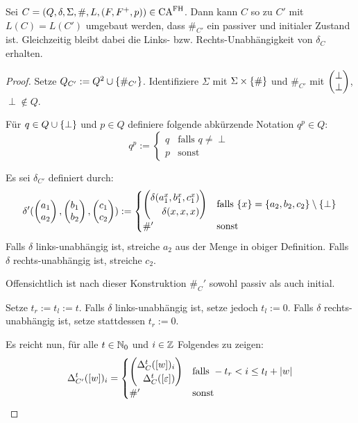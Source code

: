 \begin{satz}
    Sei $C = (Q, \delta, \Sigma, \#, L, (F, F^+, p)) \in \textrm{CA}^{\textrm{FH}}$. Dann kann $C$ so zu $C'$ mit $L(C) = L(C')$ umgebaut werden, dass $\#_{C'}$ ein passiver und initialer Zustand ist.
    Gleichzeitig bleibt dabei die Links- \acs{bzw.} Rechts-Unabhängigkeit von $\delta_C$ erhalten.
\end{satz}
\begin{proof}
    Setze $Q_{C'} := Q^2 \cup \{ { \#_{C'} } \}$. Identifiziere $\Sigma$ mit $ \Sigma \times \{ {\#} \}$ und $\#_{C'}$ mit $\Spvek{\perp; \perp}$, $\perp \not\in Q$.

    Für $q \in Q \cup \{ {\perp} \}$ und $p \in Q$ definiere folgende abkürzende Notation $q^p \in Q$:
    \[
        q^p := 
        \begin{cases}
            q & \text{falls } q \neq \perp \\
            p & \text{sonst}
        \end{cases}
    \]
    
    Es sei $\delta_{C'}$ definiert durch:
    \[
       \delta'(\Spvek{a_1; a_2}, \Spvek{b_1; b_2}, \Spvek{c_1; c_2}) :=
       \begin{cases}
         \Spvek{  \delta(a_1 ^ {x}, b_1 ^ {x}, c_1 ^ {x}); \delta(x, x, x)  } 
         & \text{falls }
         \finset{x} = \finset{a_2, b_2, c_2} \setminus \finset{ \perp } \\
         \#'
         & \text{sonst}
       \end{cases}
    \]
    Falls $\delta$ links-unabhängig ist, streiche $a_2$ aus der Menge in obiger Definition.
    Falls $\delta$ rechts-unabhängig ist, streiche $c_2$.
    
    Offensichtlich ist nach dieser Konstruktion $\#_C'$ sowohl passiv als auch initial.
    
    Setze $t_r := t_l := t$.
    Falls $\delta$ links-unabhängig ist, setze jedoch $t_l := 0$.
    Falls $\delta$ rechts-unabhängig ist, setze stattdessen $t_r := 0$.
    
    Es reicht nun, für alle $t \in \mathbb{N}_0$ und $i \in \mathbb{Z}$ Folgendes zu zeigen:
    \[
        \Delta_{C'}^t([w])_i = \begin{cases}
            \Spvek{\Delta_C^t([w])_i; \Delta^t_{C}([\varepsilon])} &
                \text{falls } -t_r < i \leq t_l + |w| \\
            \#' & \text{sonst}
        \end{cases}
    \]
    

\end{proof}
